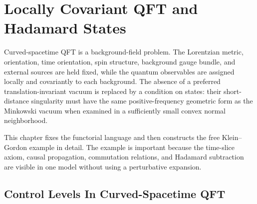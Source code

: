 \chapter{Locally Covariant QFT and Hadamard States}
\label{ch:locally-covariant-qft-hadamard}

\ConventionsMixed

Curved-spacetime QFT is a background-field problem.  The Lorentzian metric,
orientation, time orientation, spin structure, background gauge bundle, and
external sources are held fixed, while the quantum observables are assigned
locally and covariantly to each background.  The absence of a preferred
translation-invariant vacuum is replaced by a condition on states: their
short-distance singularity must have the same positive-frequency geometric
form as the Minkowski vacuum when examined in a sufficiently small convex
normal neighborhood.

This chapter fixes the functorial language and then constructs the free
Klein--Gordon example in detail.  The example is important because the
time-slice axiom, causal propagation, commutation relations, and Hadamard
subtraction are visible in one model without using a perturbative expansion.

\section{Control Levels In Curved-Spacetime QFT}
\label{sec:curved-qft-control-levels}


